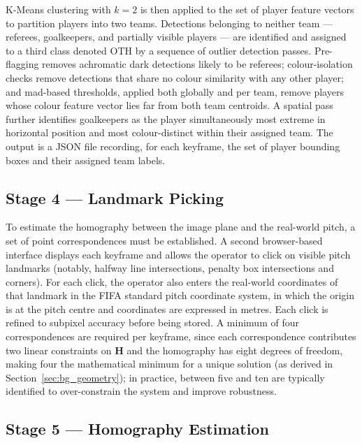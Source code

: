 K-Means clustering with $k = 2$ is then applied to the set of player feature vectors to partition players into two teams. Detections belonging to neither team — referees, goalkeepers, and partially visible players — are identified and assigned to a third class denoted OTH by a sequence of outlier detection passes. Pre-flagging removes achromatic dark detections likely to be referees; colour-isolation checks remove detections that share no colour similarity with any other player; and \gls{mad}-based thresholds, applied both globally and per team, remove players whose colour feature vector lies far from both team centroids. A spatial pass further identifies goalkeepers as the player simultaneously most extreme in horizontal position and most colour-distinct within their assigned team. The output is a JSON file recording, for each keyframe, the set of player bounding boxes and their assigned team labels.

\subsection{Stage 4 — Landmark Picking}%
\label{sec:design_landmarks}

To estimate the homography between the image plane and the real-world pitch, a set of point correspondences must be established. A second browser-based interface displays each keyframe and allows the operator to click on visible pitch landmarks (notably, halfway line intersections, penalty box intersections and corners). For each click, the operator also enters the real-world coordinates of that landmark in the FIFA standard pitch coordinate system, in which the origin is at the pitch centre and coordinates are expressed in metres. Each click is refined to subpixel accuracy before being stored. A minimum of four correspondences are required per keyframe, since each correspondence contributes two linear constraints on $\mathbf{H}$ and the homography has eight degrees of freedom, making four the mathematical minimum for a unique solution (as derived in Section~\ref{sec:bg_geometry}); in practice, between five and ten are typically identified to over-constrain the system and improve robustness.

\subsection{Stage 5 — Homography Estimation}%
\label{sec:design_homography}


